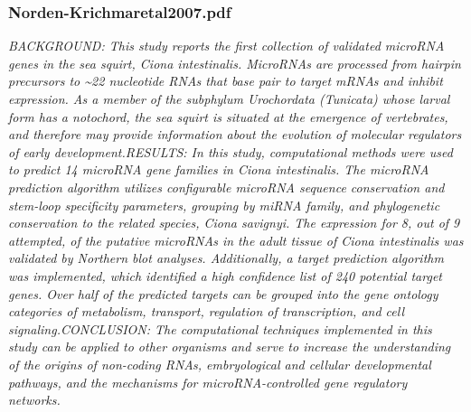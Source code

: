 \subsubsection{Norden-Krichmaretal2007.pdf}
\cite{Norden-Krichmar2007}
\textit{BACKGROUND: This study reports the first collection of validated microRNA genes in the sea squirt, Ciona intestinalis. MicroRNAs are processed from hairpin precursors to {\~{}}22 nucleotide RNAs that base pair to target mRNAs and inhibit expression. As a member of the subphylum Urochordata (Tunicata) whose larval form has a notochord, the sea squirt is situated at the emergence of vertebrates, and therefore may provide information about the evolution of molecular regulators of early development.RESULTS: In this study, computational methods were used to predict 14 microRNA gene families in Ciona intestinalis. The microRNA prediction algorithm utilizes configurable microRNA sequence conservation and stem-loop specificity parameters, grouping by miRNA family, and phylogenetic conservation to the related species, Ciona savignyi. The expression for 8, out of 9 attempted, of the putative microRNAs in the adult tissue of Ciona intestinalis was validated by Northern blot analyses. Additionally, a target prediction algorithm was implemented, which identified a high confidence list of 240 potential target genes. Over half of the predicted targets can be grouped into the gene ontology categories of metabolism, transport, regulation of transcription, and cell signaling.CONCLUSION: The computational techniques implemented in this study can be applied to other organisms and serve to increase the understanding of the origins of non-coding RNAs, embryological and cellular developmental pathways, and the mechanisms for microRNA-controlled gene regulatory networks.}

